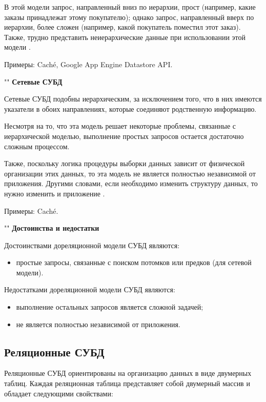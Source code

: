 \documentclass{bmstu}
\begin{document}
В этой модели запрос, направленный вниз по иерархии, прост (например, какие заказы принадлежат этому покупателю); однако запрос, направленный вверх по иерархии, более сложен (например, какой покупатель поместил этот заказ). Также, трудно представить неиерархические данные при использовании этой модели \cite{scienceforum}.

Примеры: Caché, Google App Engine Datastore API.

""\newline
\noindent\textbf{Сетевые СУБД}

Сетевые СУБД подобны иерархическим, за исключением того, что в них имеются указатели в обоих направлениях, которые соединяют родственную информацию.

Несмотря на то, что эта модель решает некоторые проблемы, связанные с иерархической моделью, выполнение простых запросов остается достаточно сложным процессом.

Также, поскольку логика процедуры выборки данных зависит от физической организации этих данных, то эта модель не является полностью независимой от приложения. Другими словами, если необходимо изменить структуру данных, то нужно изменить и приложение \cite{scienceforum}.

Примеры: Caché.

""\newline
\noindent\textbf{Достоинства и недостатки}

Достоинствами дореляционной модели СУБД являются:

\begin{itemize}
	\item простые запросы, связанные с поиском потомков или предков (для сетевой модели).
\end{itemize}

Недостатками дореляционной модели СУБД являются:

\begin{itemize}
	\item выполнение остальных запросов является сложной задачей;
	\item не является полностью независимой от приложения.
\end{itemize}

\subsection*{Реляционные СУБД}

Реляционные СУБД ориентированы на организацию данных в виде двумерных таблиц. Каждая реляционная таблица представляет собой двумерный массив и обладает следующими свойствами:
\end{document}
